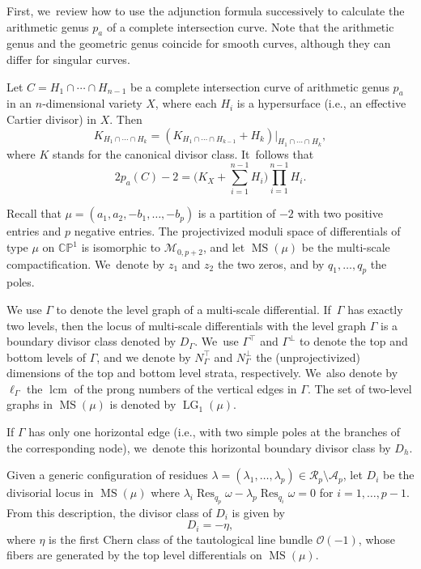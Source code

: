 \documentclass[11pt]{article}
\newcommand{\ie}{i.e.,\xspace}
\DeclareMathOperator{\lcm}{lcm}
\DeclareMathOperator\LG{LG}
\DeclareMathOperator\MS{MS}
\DeclareMathOperator\Res{Res}
\theoremstyle{definition}
\begin{document}
First, we~review how to use the adjunction formula successively to calculate the arithmetic genus $p_a$ of a complete intersection curve. Note that the arithmetic genus and the geometric genus coincide for smooth curves, although they can differ for singular curves.

Let $C = H_1\cap \cdots \cap H_{n-1}$ be a complete intersection curve of arithmetic genus $p_a$ in an $n$-dimensional variety $X$, where each $H_i$ is a hypersurface (\ie an effective Cartier divisor) in $X$. Then
\[
K_{H_1\cap\cdots \cap H_k} = \left(K_{H_1\cap \cdots \cap H_{k-1}} + H_k\right)|_{H_1\cap \cdots \cap H_{k}},
\]
where $K$ stands for the canonical divisor class. It~follows that\vspace*{-3pt}
\[
2p_a(C)-2 = \biggl(K_X + \sum_{i=1}^{n-1} H_i \biggr) \prod_{i=1}^{n-1} H_i.
\]

Recall that $\mu = (a_1, a_2, -b_1, \ldots, -b_p)$ is a partition of $-2$ with two positive entries and $p$ negative entries. The projectivized moduli space of differentials of type $\mu$ on $\mathbb{CP}^1$ is isomorphic to $\mathcal M_{0,p+2}$, and let $\MS(\mu)$ be the multi-scale compactification. We~denote by $z_1$ and $z_2$ the two zeros, and by $q_1,\ldots,q_p$ the poles.

We use $\Gamma$ to denote the level graph of a multi-scale differential. If~$\Gamma$ has exactly two levels, then the locus of multi-scale differentials with the level graph $\Gamma$ is a boundary divisor class denoted by $D_\Gamma$. We~use $\Gamma^{\top}$ and $\Gamma^{\bot}$ to denote the top and bottom levels of $\Gamma$, and we denote by $N_{\Gamma}^{\top}$ and $N_{\Gamma}^{\bot}$ the (unprojectivized) dimensions of the top and bottom level strata, respectively. We~also denote by $\ell_\Gamma$ the $\lcm$ of the prong numbers of the vertical edges in $\Gamma$. The set of two-level graphs in $\MS(\mu)$ is denoted by $\LG_1(\mu)$.

If $\Gamma$ has only one horizontal edge (\ie with two simple poles at the branches of the corresponding node), we~denote this horizontal boundary divisor class by $D_h$.

Given a generic configuration of residues $\lambda = (\lambda_{1}, \ldots, \lambda_{p})\in \mathcal{R}_{p} \setminus \mathcal{A}_{p}$, let $D_i$ be the divisorial locus in $\MS(\mu)$
where $\lambda_i \Res_{q_p}\omega - \lambda_{p} \Res_{q_i}\omega = 0$ for $i=1,\ldots, p-1$. From this description, the divisor class of $D_i$ is given by\vspace*{-3pt}\enlargethispage{\baselineskip}
\[
D_i = -\eta,
\]
where $\eta$ is the first Chern class of the tautological line bundle $\mathcal O(-1)$, whose fibers are generated by the top level differentials on $\MS(\mu)$.
\end{document}
